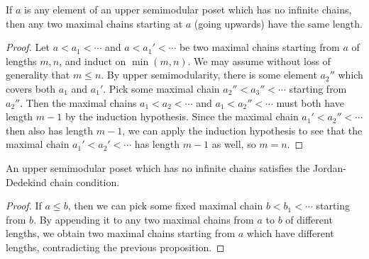 \begin{appendices}



\begin{prop} If $a$ is any element of an upper semimodular poset which has no infinite chains, then any two maximal chains starting at $a$ (going upwards) have the same length.
\end{prop}
\begin{proof} Let $a < a_1 < \cdots$ and $a < a_1' < \cdots$ be two maximal chains starting from $a$ of lengths $m, n$, and induct on $\min(m,n)$. We may assume without loss of generality that $m \le n$. By upper semimodularity, there is some element $a_2''$ which covers both $a_1$ and $a_1'$. Pick some maximal chain $a_2'' < a_3'' < \cdots$ starting from $a_2''$. Then the maximal chains $a_1 < a_2 < \cdots$ and $a_1 < a_2'' < \cdots$ must both have length $m-1$ by the induction hypothesis. Since the maximal chain $a_1' < a_2'' < \cdots$ then also has length $m-1$, we can apply the induction hypothesis to see that the maximal chain $a_1' < a_2' < \cdots$ has length $m-1$ as well, so $m = n$.
\end{proof}

\begin{cor} An upper semimodular poset which has no infinite chains satisfies the Jordan-Dedekind chain condition.
\end{cor}
\begin{proof} If $a \le b$, then we can pick some fixed maximal chain $b < b_1 < \cdots$ starting from $b$. By appending it to any two maximal chains from $a$ to $b$ of different lengths, we obtain two maximal chains starting from $a$ which have different lengths, contradicting the previous proposition.
\end{proof}


\end{appendices}
